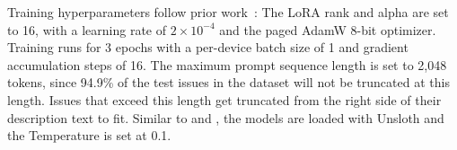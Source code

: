 Training hyperparameters follow prior work~\cite{heo2025study,aracena2025applying}: The LoRA rank and alpha are set to 16, with a learning rate of $2 \times 10^{-4}$ and the paged AdamW 8-bit optimizer. Training runs for 3 epochs with a per-device batch size of 1 and gradient accumulation steps of 16. The maximum prompt sequence length is set to 2,048 tokens, since 94.9\% of the test issues in the dataset will not be truncated at this length. Issues that exceed this length get truncated from the right side of their description text to fit.
Similar to \ragtag and \bragtag, the models are loaded with Unsloth and the Temperature is set at 0.1.

